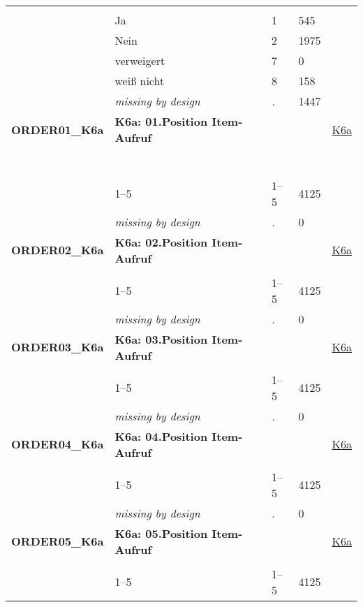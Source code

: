 \begin{longtable}{| L{2.65cm} | L{8cm} | C{1.5cm} | R{1.25cm} | C{2.25cm}  |}
   &  &  &  &  \\ 
   & Ja & 1 & 545 &  \\ 
   & Nein & 2 & 1975 &  \\ 
   & verweigert & 7 & 0 &  \\ 
   & weiß nicht & 8 & 158 &  \\ 
   & \textit{missing by design} & \textit{.} & 1447 &  \\ 
   \midrule
\textbf{ORDER01\_K6a}\label{var:ORDER01:K6a} & \textbf{K6a: 01.Position Item-Aufruf} &  &  & \hyperref[K6a]{K6a} \\ 
   & \protect\subsection[Variablen ORDER01\_K6a bis K10]{} &  &  &  \\ 
   & 1--5 & 1--5 & 4125 &  \\ 
   & \textit{missing by design} & \textit{.} & 0 &  \\ 
   \midrule
\textbf{ORDER02\_K6a}\label{var:ORDER02:K6a} & \textbf{K6a: 02.Position Item-Aufruf} &  &  & \hyperref[K6a]{K6a} \\ 
   &  &  &  &  \\ 
   & 1--5 & 1--5 & 4125 &  \\ 
   & \textit{missing by design} & \textit{.} & 0 &  \\ 
   \midrule
\textbf{ORDER03\_K6a}\label{var:ORDER03:K6a} & \textbf{K6a: 03.Position Item-Aufruf} &  &  & \hyperref[K6a]{K6a} \\ 
   &  &  &  &  \\ 
   & 1--5 & 1--5 & 4125 &  \\ 
   & \textit{missing by design} & \textit{.} & 0 &  \\ 
   \midrule
\textbf{ORDER04\_K6a}\label{var:ORDER04:K6a} & \textbf{K6a: 04.Position Item-Aufruf} &  &  & \hyperref[K6a]{K6a} \\ 
   &  &  &  &  \\ 
   & 1--5 & 1--5 & 4125 &  \\ 
   & \textit{missing by design} & \textit{.} & 0 &  \\ 
   \midrule
\textbf{ORDER05\_K6a}\label{var:ORDER05:K6a} & \textbf{K6a: 05.Position Item-Aufruf} &  &  & \hyperref[K6a]{K6a} \\ 
   &  &  &  &  \\ 
   & 1--5 & 1--5 & 4125 &  \\ 

\end{longtable}
